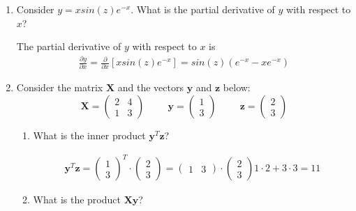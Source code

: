 \documentclass[letterpaper]{article}
\theoremstyle{definition}
\begin{document}
\begin{enumerate}
\item Consider \(y = x sin(z) e^{-x}\). What is the partial derivative of \(y\) with respect to \(x\)?

\color{teal}
The partial derivative of \(y\) with respect to \(x\) is
\begin{align*}
\frac{\partial y}{\partial x} = \frac{\partial}{\partial x}\left[ x sin(z) e^{-x}\right]
= sin(z) (e^{-x} - x{e^{-x}})
\end{align*}
\color{black}

\item Consider the matrix \(\mathbf{X}\) and the vectors \(\mathbf{y}\) and \(\mathbf{z}\) below:
$$
   \mathbf{X} = \begin{pmatrix}2 & 4 \\ 1 & 3\end{pmatrix}\hspace{1cm}
   \mathbf{y} = \begin{pmatrix}1 \\ 3\end{pmatrix}\hspace{1cm}
   \mathbf{z} = \begin{pmatrix}2 \\ 3\end{pmatrix}
   $$

\begin{enumerate}
\item What is the inner product \(\mathbf{y}^T \mathbf{z}\)?

\color{teal}

\begin{align*}
\mathbf{y}^T \mathbf{z} = \begin{pmatrix}1 \\ 3\end{pmatrix}^T \cdot \begin{pmatrix}2 \\ 3\end{pmatrix}
= \begin{pmatrix}1 & 3\end{pmatrix} \cdot \begin{pmatrix}2 \\ 3\end{pmatrix}
1 \cdot 2 + 3 \cdot 3 = 11
\end{align*}
\color{black}

\item What is the product \(\mathbf{Xy}\)?

\color{teal}


\end{enumerate}
\end{enumerate}
\end{document}

